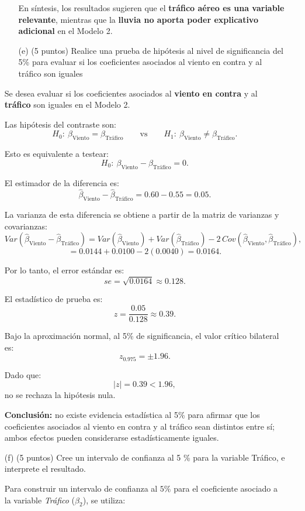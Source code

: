 \documentclass[10pt,a4paper]{article}
\begin{document}
\begin{enumerate}
\begin{enumerate}
En síntesis, los resultados sugieren que el \textbf{tráfico aéreo es una variable relevante},
mientras que la \textbf{lluvia no aporta poder explicativo adicional} en el Modelo 2.

\color{black}
  \item[(e)] (5 puntos) Realice una prueba de hipótesis al nivel de significancia del 5\% para evaluar si los coeficientes asociados al viento en contra y al tráfico son iguales
\end{enumerate}
\color{blue}
Se desea evaluar si los coeficientes asociados al \textbf{viento en contra} y al
\textbf{tráfico} son iguales en el Modelo 2.

Las hipótesis del contraste son:
\[
H_0:\ \beta_{\text{Viento}} = \beta_{\text{Tráfico}}
\qquad \text{vs} \qquad
H_1:\ \beta_{\text{Viento}} \neq \beta_{\text{Tráfico}}.
\]

Esto es equivalente a testear:
\[
H_0:\ \beta_{\text{Viento}} - \beta_{\text{Tráfico}} = 0.
\]

El estimador de la diferencia es:
\[
\hat\beta_{\text{Viento}} - \hat\beta_{\text{Tráfico}}
= 0.60 - 0.55 = 0.05.
\]

La varianza de esta diferencia se obtiene a partir de la matriz de varianzas y covarianzas:
\[
Var(\hat\beta_{\text{Viento}} - \hat\beta_{\text{Tráfico}})
= Var(\hat\beta_{\text{Viento}})
+ Var(\hat\beta_{\text{Tráfico}})
- 2\,Cov(\hat\beta_{\text{Viento}},\hat\beta_{\text{Tráfico}}),
\]
\[
= 0.0144 + 0.0100 - 2(0.0040) = 0.0164.
\]

Por lo tanto, el error estándar es:
\[
se = \sqrt{0.0164} \approx 0.128.
\]

El estadístico de prueba es:
\[
z = \frac{0.05}{0.128} \approx 0.39.
\]

Bajo la aproximación normal, al 5\% de significancia, el valor crítico bilateral es:
\[
z_{0.975} = \pm 1.96.
\]

Dado que:
\[
|z| = 0.39 < 1.96,
\]
no se rechaza la hipótesis nula.

\textbf{Conclusión:} no existe evidencia estadística al 5\% para afirmar que los coeficientes
asociados al viento en contra y al tráfico sean distintos entre sí; ambos efectos pueden
considerarse estadísticamente iguales.

\color{black}
  \item[(f)] (5 puntos) Cree un intervalo de confianza al 5 \% para la variable Tráfico, e interprete el resultado.

\color{blue}
Para construir un intervalo de confianza al \(5\%\) para el coeficiente
asociado a la variable \emph{Tráfico} (\(\beta_2\)), se utiliza:


\end{enumerate}
\end{document}
